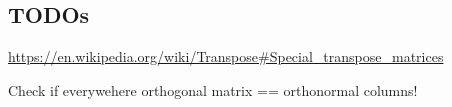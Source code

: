 \documentclass[a4paper, 11pt, landscape]{article}
\begin{document}
\begin{multicols*}{3}
\section{TODOs}
\url{https://en.wikipedia.org/wiki/Transpose#Special_transpose_matrices}

Check if everywehere orthogonal matrix == orthonormal columns!



\raggedcolumns
\end{multicols*}
\end{document}
